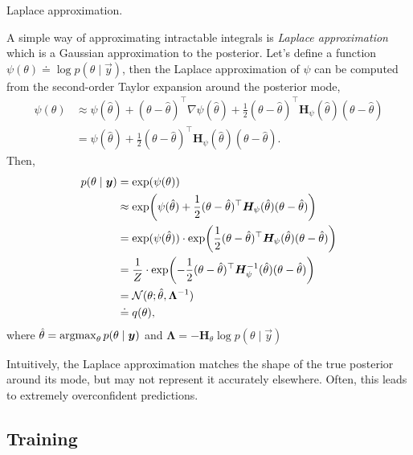 \begin{example}
  \caption{Laplace approximation.}

  A simple way of approximating intractable integrals is \textit{Laplace
  approximation} which is a Gaussian approximation to the posterior. Let's
  define a function $\psi(\theta)\doteq\log p(\theta\mid \vec{y})$, then the
  Laplace approximation of $\psi$ can be computed from the second-order Taylor
  expansion around the posterior mode,
  \begin{align*}
    \psi(\theta) &\approx \psi(\hat{\theta}) + (\theta - \hat{\theta})^\top \nabla \psi(\hat{\theta}) + \frac{1}{2} (\theta-\hat{\theta})^\top \bm{H}_{\psi}(\hat{\theta}) (\theta - \hat{\theta}) \\
    &= \psi(\hat{\theta}) + \frac{1}{2} (\theta-\hat{\theta})^\top \bm{H}_{\psi}(\hat{\theta}) (\theta - \hat{\theta})
  .\end{align*}
  Then,
  \begin{align*}
    p(\theta\mid\vec{y}) &= \exp(\psi(\theta)) \\
    &\approx \exp\lft(\psi(\hat{\theta}) + \frac{1}{2} (\theta-\hat{\theta})^\top \bm{H}_{\psi}(\hat{\theta}) (\theta - \hat{\theta})\rgt) \\
    &= \exp (\psi(\hat{\theta})) \cdot \exp\lft(\frac{1}{2} (\theta-\hat{\theta})^\top \bm{H}_{\psi}(\hat{\theta}) (\theta - \hat{\theta})\rgt) \\
    &= \frac{1}{Z} \cdot \exp\lft(-\frac{1}{2} (\theta-\hat{\theta})^\top \bm{H}^{-1}_{\psi}(\hat{\theta}) (\theta - \hat{\theta})\rgt) \\
    &= \mathcal{N}(\theta ; \hat{\theta}, \bm{\Lambda}^{-1}) \\
    &\doteq q(\theta)
  ,\end{align*}
  where $\hat{\theta}=\operatorname*{argmax}_{\theta} p(\theta\mid\bm{y})$ and $\bm{\Lambda} =
  -\bm{H}_{\theta} \log p(\theta\mid\vec{y})$

  \vspace{1em}

  Intuitively, the Laplace approximation matches the shape of the true
  posterior around its mode, but may not represent it accurately elsewhere.
  Often, this leads to extremely overconfident predictions.
\end{example}

\subsection{Training}

